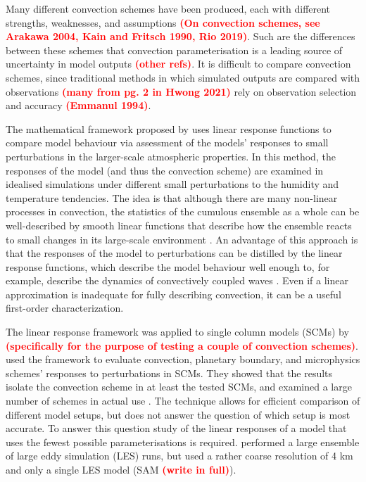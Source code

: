 \documentclass[draft]{agujournal2019}
\newcommand{\todo}[1]{\textcolor{red}{\textbf{(#1)}}}
\begin{document}
Many different convection schemes have been produced, each with different
strengths, weaknesses, and assumptions \todo{On convection schemes, see Arakawa
2004, Kain and Fritsch 1990, Rio 2019}. Such are the differences between these
schemes that convection parameterisation is a leading source of uncertainty in
model outputs \cite{Hwong_JAMES_2021} \todo{other refs}. It is difficult to
compare convection schemes, since traditional methods in which simulated outputs
are compared with observations \todo{many from pg. 2 in Hwong 2021} rely on
observation selection and accuracy \cite{Hwong_JAMES_2021} \todo{Emmanul 1994}.

The mathematical framework proposed by  uses linear
response functions to compare model behaviour via assessment of the models'
responses to small perturbations in the larger-scale atmospheric properties. In
this method, the responses of the model (and thus the convection scheme) are
examined in idealised simulations under different small perturbations to the
humidity and temperature tendencies. The idea is that although there are many
non-linear processes in convection, the statistics of the cumulous ensemble as a
whole can be well-described by smooth linear functions that describe how the
ensemble reacts to small changes in its large-scale environment
\cite{Kuang_JAS_2010}. An advantage of this approach is that the responses of
the model to perturbations can be distilled by the linear response functions,
which describe the model behaviour well enough to, for example, describe the
dynamics of convectively coupled waves \cite{Kuang_JAS_2010}. Even if a linear
approximation is inadequate for fully describing convection, it can be a useful
first-order characterization.

The linear response framework was applied to single column models (SCMs) by
 \todo{specifically for the purpose of testing a couple
of convection schemes}.  used the framework to evaluate
convection, planetary boundary, and microphysics schemes' responses to
perturbations in SCMs. They showed that the results isolate the convection
scheme in at least the tested SCMs, and examined a large number of schemes in
actual use \cite{Hwong_JAMES_2021}. The technique allows for efficient
comparison of different model setups, but does not answer the question of which
setup is most accurate. To answer this question study of the linear responses of
a model that uses the fewest possible parameterisations is required.
 performed a large ensemble of large eddy simulation (LES)
runs, but used a rather coarse resolution of 4 km and only a single LES model
(SAM \todo{write in full}).
\end{document}
